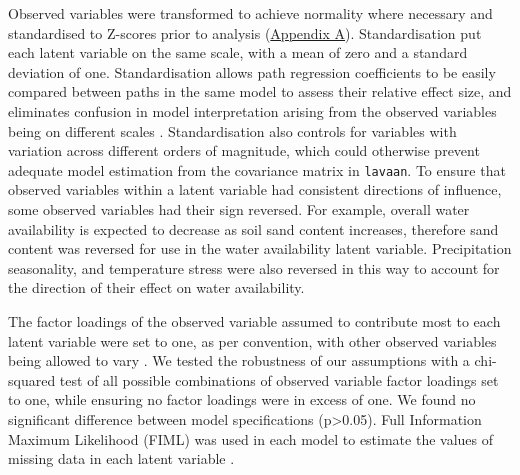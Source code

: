 \documentclass[11pt,a4paper]{article}
\begin{document}
Observed variables were transformed to achieve normality where necessary and standardised to Z-scores prior to analysis (\hyperref[appendixa]{Appendix A}). Standardisation put each latent variable on the same scale, with a mean of zero and a standard deviation of one. Standardisation allows path regression coefficients to be easily compared between paths in the same model to assess their relative effect size, and eliminates confusion in model interpretation arising from the observed variables being on different scales \citep{Beaujean2014}. Standardisation also controls for variables with variation across different orders of magnitude, which could otherwise prevent adequate model estimation from the covariance matrix in \verb|lavaan|. To ensure that observed variables within a latent variable had consistent directions of influence, some observed variables had their sign reversed. For example, overall water availability is expected to decrease as soil sand content increases, therefore sand content was reversed for use in the water availability latent variable. Precipitation seasonality, and temperature stress were also reversed in this way to account for the direction of their effect on water availability. 

The factor loadings of the observed variable assumed to contribute most to each latent variable were set to one, as per convention, with other observed variables being allowed to vary \citep{Beaujean2014}.  We tested the robustness of our assumptions with a chi-squared test of all possible combinations of observed variable factor loadings set to one, while ensuring no factor loadings were in excess of one. We found no significant difference between model specifications (p>0.05). Full Information Maximum Likelihood (FIML) was used in each model to estimate the values of missing data in each latent variable \citep{Cham2017}.
\end{document}
